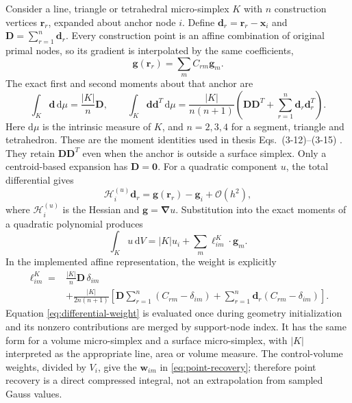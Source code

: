 \documentclass[11pt]{article}
\newcommand{\grad}{\bm{\nabla}}
\newcommand{\dd}{\mathrm{d}}
\newcommand{\Order}{\mathcal{O}}
\begin{document}
Consider a line, triangle or tetrahedral micro-simplex $K$ with $n$ construction vertices $\bm r_r$, expanded about anchor node $i$.  Define $\bm d_r=\bm r_r-\bm x_i$ and $\bm D=\sum_{r=1}^{n}\bm d_r$.  Every construction point is an affine combination of original primal nodes, so its gradient is interpolated by the same coefficients,
\begin{equation}
 \bm g(\bm r_r)=\sum_m C_{rm}\bm g_m.
\label{eq:affine-gradient}
\end{equation}
The exact first and second moments about that anchor are
\begin{equation}
 \int_K\bm d\,\dd\mu=\frac{|K|}{n}\bm D,\qquad
 \int_K\bm d\bm d^T\,\dd\mu=
 \frac{|K|}{n(n+1)}
 \left(\bm D\bm D^T+\sum_{r=1}^{n}\bm d_r\bm d_r^T\right).
 \label{eq:simplex-moments}
\end{equation}
Here $\dd\mu$ is the intrinsic measure of $K$, and $n=2,3,4$ for a segment, triangle and tetrahedron.  These are the moment identities used in thesis Eqs.~(3-12)--(3-15) \cite{ma2026thesis,liu1998}.  They retain $\bm D\bm D^T$ even when the anchor is outside a surface simplex.  Only a centroid-based expansion has $\bm D=\bm 0$.
For a quadratic component $u$, the total differential gives
\begin{equation}
 \bm{\mathcal H}^{(u)}_i\bm d_r=\bm g(\bm r_r)-\bm g_i+\Order(h^2),
 \label{eq:total-differential}
\end{equation}
where $\bm{\mathcal H}^{(u)}_i$ is the Hessian and $\bm g=\grad u$.  Substitution into the exact moments of a quadratic polynomial produces
\begin{equation}
 \int_K u\,\dd V=|K|u_i+\sum_m\bm\ell^{K}_{im}\cdot\bm g_m .
 \label{eq:volume-functional}
\end{equation}
In the implemented affine representation, the weight is explicitly
\begin{equation}
\begin{split}
 \bm\ell^{K}_{im}={}&\frac{|K|}{n}\bm D\,\delta_{im}\\
 &+\frac{|K|}{2n(n+1)}
 \left[
   \bm D\sum_{r=1}^{n}(C_{rm}-\delta_{im})
  +\sum_{r=1}^{n}\bm d_r(C_{rm}-\delta_{im})
 \right].
\end{split}
\label{eq:differential-weight}
\end{equation}
Equation \eqref{eq:differential-weight} is evaluated once during geometry initialization and its nonzero contributions are merged by support-node index.  It has the same form for a volume micro-simplex and a surface micro-simplex, with $|K|$ interpreted as the appropriate line, area or volume measure.  The control-volume weights, divided by $V_i$, give the $\bm w_{im}$ in \eqref{eq:point-recovery}; therefore point recovery is a direct compressed integral, not an extrapolation from sampled Gauss values.
\end{document}
